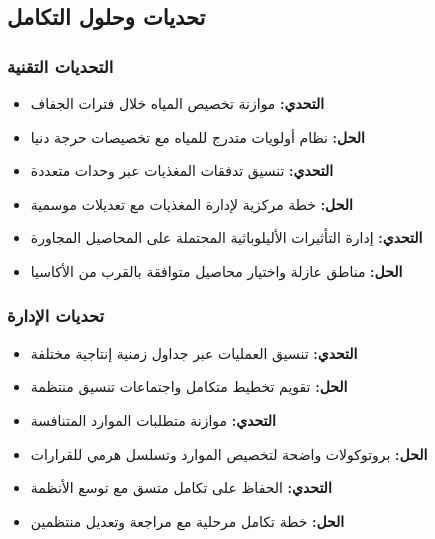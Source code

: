 \subsection{تحديات وحلول التكامل}

\subsubsection{التحديات التقنية}
\begin{itemize}
    \item \textbf{التحدي:} موازنة تخصيص المياه خلال فترات الجفاف
    \item \textbf{الحل:} نظام أولويات متدرج للمياه مع تخصيصات حرجة دنيا
    
    \item \textbf{التحدي:} تنسيق تدفقات المغذيات عبر وحدات متعددة
    \item \textbf{الحل:} خطة مركزية لإدارة المغذيات مع تعديلات موسمية
    
    \item \textbf{التحدي:} إدارة التأثيرات الأليلوباثية المحتملة على المحاصيل المجاورة
    \item \textbf{الحل:} مناطق عازلة واختيار محاصيل متوافقة بالقرب من الأكاسيا
\end{itemize}

\subsubsection{تحديات الإدارة}
\begin{itemize}
    \item \textbf{التحدي:} تنسيق العمليات عبر جداول زمنية إنتاجية مختلفة
    \item \textbf{الحل:} تقويم تخطيط متكامل واجتماعات تنسيق منتظمة
    
    \item \textbf{التحدي:} موازنة متطلبات الموارد المتنافسة
    \item \textbf{الحل:} بروتوكولات واضحة لتخصيص الموارد وتسلسل هرمي للقرارات
    
    \item \textbf{التحدي:} الحفاظ على تكامل متسق مع توسع الأنظمة
    \item \textbf{الحل:} خطة تكامل مرحلية مع مراجعة وتعديل منتظمين
\end{itemize}
